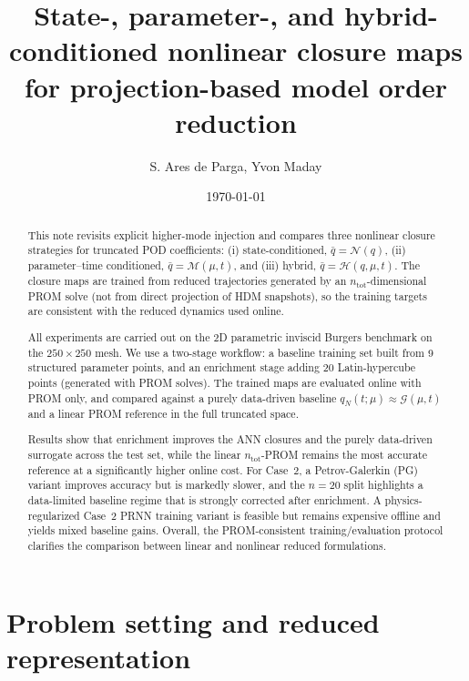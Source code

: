 \documentclass[11pt]{article}
\title{\vspace{-1.5em}
State-, parameter-, and hybrid-conditioned nonlinear closure maps for projection-based model order reduction}
\author{S. Ares de Parga, Yvon Maday}
\date{\today}
\begin{document}
\maketitle
\vspace{-1.0em}

\begin{abstract}
This note revisits explicit higher-mode injection and compares three nonlinear closure strategies for truncated POD coefficients: (i) state-conditioned, $\bar q=\mathcal N(q)$, (ii) parameter--time conditioned, $\bar q=\mathcal M(\mu,t)$, and (iii) hybrid, $\bar q=\mathcal H(q,\mu,t)$. The closure maps are trained from reduced trajectories generated by an $n_{\mathrm{tot}}$-dimensional PROM solve (not from direct projection of HDM snapshots), so the training targets are consistent with the reduced dynamics used online.

All experiments are carried out on the 2D parametric inviscid Burgers benchmark on the $250\times250$ mesh. We use a two-stage workflow: a baseline training set built from 9 structured parameter points, and an enrichment stage adding 20 Latin-hypercube points (generated with PROM solves). The trained maps are evaluated online with PROM only, and compared against a purely data-driven baseline $q_N(t;\mu)\approx\mathcal G(\mu,t)$ and a linear PROM reference in the full truncated space.

Results show that enrichment improves the ANN closures and the purely data-driven surrogate across the test set, while the linear $n_{\mathrm{tot}}$-PROM remains the most accurate reference at a significantly higher online cost. For Case~2, a Petrov-Galerkin (PG) variant improves accuracy but is markedly slower, and the $n=20$ split highlights a data-limited baseline regime that is strongly corrected after enrichment. A physics-regularized Case~2 PRNN training variant is feasible but remains expensive offline and yields mixed baseline gains. Overall, the PROM-consistent training/evaluation protocol clarifies the comparison between linear and nonlinear reduced formulations.
\end{abstract}

\vspace{-1.0em}

\section{Problem setting and reduced representation}
\end{document}
